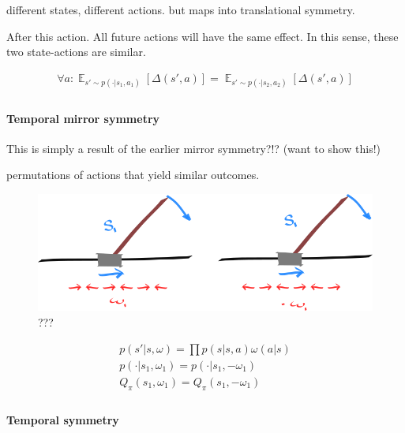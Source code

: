 different states, different actions. but maps into translational
symmetry.

After this action. All future actions will have the same effect. In this
sense, these two state-actions are similar.

\begin{align}
\forall a: \mathop{\mathbb E}_{s' \sim p(\cdot| s_1, a_1)} [\Delta(s', a)] =  \mathop{\mathbb E}_{s' \sim p(\cdot| s_2, a_2)} [\Delta(s', a)] \\
\end{align}

\hypertarget{temporal-mirror-symmetry}{%
\paragraph{Temporal mirror symmetry}\label{temporal-mirror-symmetry}}

This is simply a result of the earlier mirror symmetry?!? (want to show
this!)

permutations of actions that yield similar outcomes.

\begin{figure}
\centering
\includegraphics[width=1\textwidth,height=0.25\textheight]{../../pictures/drawings/cart-pole-temporal-mirror.png}
\caption{???}
\end{figure}

\begin{align}
p(s'|s, \omega) = \prod p(s|s, a)\omega(a|s) \\
p(\cdot|s_1, \omega_1) = p(\cdot|s_1, -\omega_1) \\
Q_{\pi}(s_1, \omega_1) = Q_{\pi}(s_1,-\omega_1) \\
\end{align}

\hypertarget{temporal-symmetry}{%
\paragraph{Temporal symmetry}\label{temporal-symmetry}}

